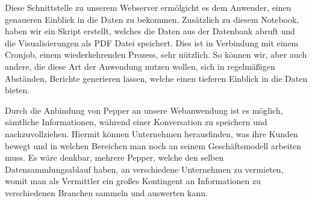 Diese Schnittstelle zu unserem Webserver ermölgicht es dem Anwender, einen genaueren Einblick in die Daten zu bekommen. Zusätzlich zu diesem Notebook, haben wir ein Skript erstellt, welches die Daten aus der Datenbank abruft und die Visualisierungen als PDF Datei speichert. Dies ist in Verbindung mit einem Cronjob, einem wiederkehrenden Prozess, sehr nützlich. So können wir, aber auch andere, die diese Art der Anwendung nutzen wollen, sich in regelmäßigen Abständen, Berichte generieren lassen, welche einen tieferen Einblick in die Daten bieten.

Durch die Anbindung von Pepper an unsere Webanwendung ist es möglich, sämtliche Informationen, während einer Konversation zu speichern und nachzuvollziehen. Hiermit können Unternehmen herausfinden, was ihre Kunden bewegt und in welchen Bereichen man noch an seinem Geschäftsmodell arbeiten muss. Es wäre denkbar, mehrere Pepper, welche den selben Datensammlungsablauf haben, an verschiedene Unternehmen zu vermieten, womit man als Vermittler ein großes Kontingent an Informationen zu verschiedenen Branchen sammeln und auswerten kann.\\

